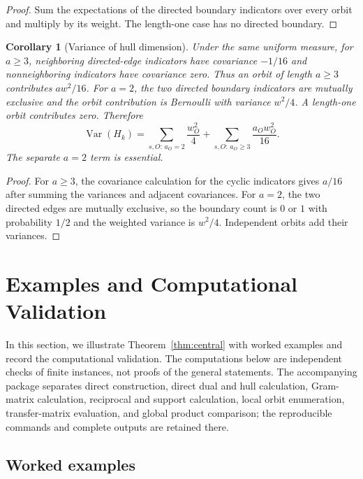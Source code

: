 \documentclass[11pt]{article}
\theoremstyle{plain}
\newtheorem{corollary}{Corollary}[section]
\theoremstyle{definition}
\theoremstyle{remark}
\begin{document}
\begin{proof}
Sum the expectations of the directed boundary indicators over every orbit and multiply by its weight. The length-one case has no directed boundary.
\end{proof}

\begin{corollary}[Variance of hull dimension]\label{cor:variance}
Under the same uniform measure, for $a\geq3$, neighboring directed-edge indicators have covariance $-1/16$ and nonneighboring indicators have covariance zero. Thus an orbit of length $a\geq3$ contributes $aw^2/16$. For $a=2$, the two directed boundary indicators are mutually exclusive and the orbit contribution is Bernoulli with variance $w^2/4$. A length-one orbit contributes zero. Therefore
\begin{equation}
\operatorname{Var}(H_k)
 =\sum_{s,O:\,a_O=2}\frac{w_O^2}{4}
  +\sum_{s,O:\,a_O\geq3}\frac{a_Ow_O^2}{16}.
\end{equation}
The separate $a=2$ term is essential.
\end{corollary}

\begin{proof}
For $a\geq3$, the covariance calculation for the cyclic indicators gives $a/16$ after summing the variances and adjacent covariances. For $a=2$, the two directed edges are mutually exclusive, so the boundary count is $0$ or $1$ with probability $1/2$ and the weighted variance is $w^2/4$. Independent orbits add their variances.
\end{proof}

\section{Examples and Computational Validation}\label{sec:examples}

In this section, we illustrate Theorem~\ref{thm:central} with worked examples and record the computational validation. The computations below are independent checks of finite instances, not proofs of the general statements. The accompanying package separates direct construction, direct dual and hull calculation, Gram-matrix calculation, reciprocal and support calculation, local orbit enumeration, transfer-matrix evaluation, and global product comparison; the reproducible commands and complete outputs are retained there.

\subsection{Worked examples}
\end{document}
